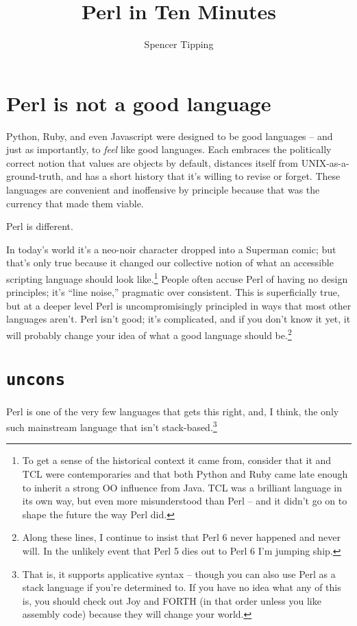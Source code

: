 \documentclass{article}
\title{Perl in Ten Minutes}
\author{Spencer Tipping}
\begin{document}
\maketitle
\tableofcontents

\section{Perl is not a good language}

Python, Ruby, and even Javascript were designed to be good languages -- and
just as importantly, to {\em feel} like good languages. Each embraces the
politically correct notion that values are objects by default, distances itself
from UNIX-as-a-ground-truth, and has a short history that it's willing to
revise or forget. These languages are convenient and inoffensive by principle
because that was the currency that made them viable.

Perl is different.

In today's world it's a neo-noir character dropped into a Superman comic; but
that's only true because it changed our collective notion of what an accessible
scripting language should look like.\footnote{To get a sense of the historical
context it came from, consider that it and TCL were contemporaries and that
both Python and Ruby came late enough to inherit a strong OO influence from
Java. TCL was a brilliant language in its own way, but even more misunderstood
than Perl -- and it didn't go on to shape the future the way Perl did.} People
often accuse Perl of having no design principles; it's ``line noise,''
pragmatic over consistent. This is superficially true, but at a deeper level
Perl is uncompromisingly principled in ways that most other languages aren't.
Perl isn't good; it's complicated, and if you don't know it yet, it will
probably change your idea of what a good language should be.\footnote{Along
these lines, I continue to insist that Perl 6 never happened and never will. In
the unlikely event that Perl 5 dies out to Perl 6 I'm jumping ship.}

\section{\tt uncons}

Perl is one of the very few languages that gets this right, and, I think, the
only such mainstream language that isn't stack-based.\footnote{That is, it
supports applicative syntax -- though you can also use Perl as a stack language
if you're determined to. If you have no idea what any of this is, you should
check out Joy and FORTH (in that order unless you like assembly code) because
they will change your world.}
\end{document}
